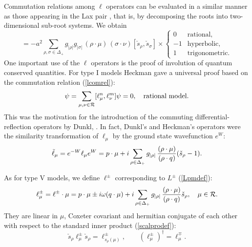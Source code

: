 \documentclass[a4paper,12pt]{article}
\begin{document}
Commutation relations among \(\ell\) operators can be evaluated in
a similar manner as those appearing in the Lax pair \cite{bcs2,bms},
that is, by
decomposing the roots into two-dimensional sub-root systems.
We obtain
\begin{equation}
   [\ell_{\mu},\ell_{\nu}]=-a^2\sum_{\rho,\sigma\in\Delta_{+}}
   g_{|\rho|}g_{|\sigma|}
   \,(\rho\cdot\mu)\,(\sigma\cdot\nu)[\check{s}_{\rho},\check{s}_{\sigma}]
   \times\left\{
   \begin{array}{rl}
      0&\mbox{rational},\\
      -1&\mbox{hyperbolic},\\
      1&\mbox{trigonometric}.
   \end{array}
   \right.
   \label{lcomrel}
\end{equation}
One important use of the \(\ell\) operators is the proof of
involution of quantum
conserved quantities.
For type I models Heckman \cite{Heck2} gave a universal proof
based on the commutation relation (\ref{lcomrel}):
\begin{equation}
   [Q_n,Q_m]\psi=
   \sum_{\mu,\nu\in{\cal R}}[\ell_\mu^n,\ell_\nu^m]\psi=0,\quad
   \mbox{rational model}.
\end{equation}
This was the motivation for the introduction of the commuting
differential-reflection operators by Dunkl, \cite{Dunk}.
In fact, Dunkl's and Heckman's operators were the similarity
transformation of
\(\ell_\mu\) by the ground state wavefunction \(e^W\):
\begin{equation}
   \tilde{\ell}_\mu=e^{-W}\ell_\mu e^W=
   p\cdot\mu+i
   \sum_{\rho\in\Delta_{+}}g_{|\rho|}
      \,{(\rho\cdot\mu)\over (\rho\cdot q)}(\check{s}_{\rho}-1).
\end{equation}



As for type V  models, we define
\(\ell^{\pm}\) corresponding to \(L^{\pm}\) (\ref{Lpmdef}):
\begin{equation}
   \ell_{\mu}^{\pm}=\ell^\pm\cdot\mu=p\cdot\mu \pm i\omega(q\cdot\mu)+i
   \sum_{\rho\in\Delta_{+}}g_{|\rho|}
       \,{(\rho\cdot\mu)\over (\rho\cdot q)}\check{s}_{\rho},\quad
   \mu\in{\cal R}.
   \label{lpmdefs}
\end{equation}
They are linear in \(\mu\), Coxeter covariant and hermitian conjugate of
each other with respect to the standard inner product (\ref{scalprodef}):
\begin{equation}
   \check{s}_{\rho}\ell_{\mu}^\pm\check{s}_{\rho}=
   \ell_{s_{\rho}(\mu)}^\pm,\qquad (\ell_{\mu}^\pm)^\dagger=
   \ell_{\mu}^\mp.
\end{equation}
\end{document}
